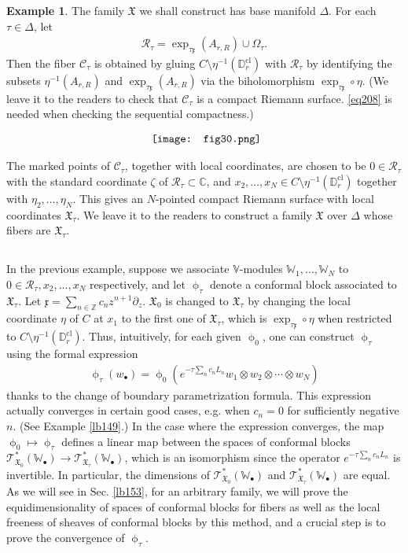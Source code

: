 \documentclass[12pt,a4paper,notitlepage]{article}
\theoremstyle{definition}
\newtheorem{eg}[df]{Example}
\theoremstyle{plain}
\newcommand{\fk}{\mathfrak}
\newcommand{\mc}{\mathcal}
\newcommand{\scr}{\mathscr}
\newcommand{\xk}{\mathfrak x}
\newcommand{\blt}{\bullet}
\newcommand{\Vbb}{\mathbb V}
\newcommand{\Wbb}{\mathbb W}
\newcommand{\Cbb}{\mathbb C}
\newcommand{\Zbb}{\mathbb Z}
\newcommand{\Dbb}{\mathbb D}
\newcommand{\cl}{\mathrm{cl}}
\numberwithin{equation}{section}
\begin{document}
\begin{eg}
The  family $\fk X$ we shall construct has base manifold $\Delta$. For each $\tau\in\Delta$, let
\begin{align*}
\mc R_\tau=\exp_{\tau\xk}(A_{r,R})\cup \Omega_\tau.
\end{align*}
Then the fiber $\mc C_\tau$ is obtained by gluing $C\setminus\eta^{-1}(\Dbb_r^\cl)$ with $\mc R_\tau$ by identifying the subsets $\eta^{-1}(A_{r,R})$ and $\exp_{\tau\xk}(A_{r,R})$ via the biholomorphism $\exp_{\tau\xk}\circ\eta$. (We leave it to the readers to check that $\mc C_\tau$ is a compact Riemann surface. \eqref{eq208} is needed when checking the sequential compactness.) 

\begin{align}
\vcenter{\hbox{{
\texttt{[image: fig30.png]}}}}
\end{align}

The marked points of $\mc C_\tau$, together with local coordinates, are chosen to be $0\in\mc R_\tau$ with the standard coordinate $\zeta$ of $\mc R_\tau\subset\Cbb$, and $x_2,\dots,x_N\in C\setminus\eta^{-1}(\Dbb_r^\cl)$ together with $\eta_2,\dots,\eta_N$. This gives an $N$-pointed compact Riemann surface with local coordinates $\fk X_\tau$. We leave it to the readers to construct a family $\fk X$ over $\Delta$ whose fibers are $\fk X_\tau$. \hfill\qedsymbol
\end{eg}


\subsection{}\label{lb110}
In the previous example, suppose we associate $\Vbb$-modules $\Wbb_1,\dots,\Wbb_N$ to $0\in\mc R_\tau,x_2,\dots,x_N$ respectively, and let $\upphi_\tau$ denote a conformal block associated to $\fk X_\tau$. Let $\xk=\sum_{n\in\Zbb} c_nz^{n+1}\partial_z$.  $\fk X_0$ is changed to $\fk X_\tau$ by changing the local coordinate $\eta$ of $C$ at $x_1$ to the first one of $\fk X_\tau$, which is $\exp_{\tau\xk}\circ\eta$ when restricted to $C\setminus\eta^{-1}(\Dbb_r^\cl)$. Thus, intuitively,  for each given $\upphi_0$, one can construct $\upphi_\tau$ using the formal expression
\begin{align}
\upphi_\tau(w_\blt)=\upphi_0(e^{-\tau\sum_n c_nL_n}w_1\otimes w_2\otimes\cdots\otimes w_N)\label{eq245}
\end{align}
thanks to the change of boundary parametrization formula. This expression actually converges in certain good cases, e.g. when $c_n=0$ for sufficiently negative $n$. (See Example \ref{lb149}.) In the case where the expression converges, the map $\upphi_0\mapsto\upphi_\tau$ defines a linear map between the spaces of conformal blocks $\scr T^*_{\fk X_0}(\Wbb_\blt)\rightarrow\scr T^*_{\fk X_\tau}(\Wbb_\blt)$, which is an isomorphism since the operator $e^{-\tau\sum_n c_nL_n}$ is invertible. In particular, the dimensions of $\scr T^*_{\fk X_0}(\Wbb_\blt)$ and $\scr T^*_{\fk X_\tau}(\Wbb_\blt)$ are equal. As we will see in Sec. \ref{lb153}, for an arbitrary family, we will prove the equidimensionality of spaces of conformal blocks for fibers as well as the local freeness of sheaves of conformal blocks by this method, and a crucial step is to prove the convergence of $\upphi_\tau$.
\end{document}
